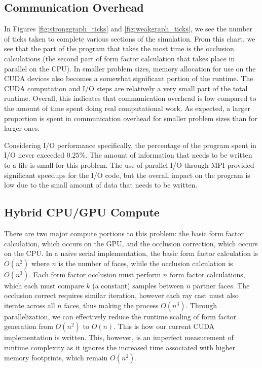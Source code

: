 \documentclass[conference]{IEEEtran}
\begin{document}
\subsection{Communication Overhead}
In Figures \ref{fig:stronggraph_ticks} and \ref{fig:weakgraph_ticks}, we see the number of ticks taken to complete various sections of the simulation. From this chart, we see that the part of the program that takes the most time is the occlusion calculations (the second part of form factor calculation that takes place in parallel on the CPU). In smaller problem sizes, memory allocation for use on the CUDA devices also becomes a somewhat significant portion of the runtime. The CUDA computation and I/O steps are relatively a very small part of the total runtime. Overall, this indicates that communication overhead is low compared to the amount of time spent doing real computational work. As expected, a larger proportion is spent in communication overhead for smaller problem sizes than for larger ones.

Considering I/O performance specifically, the percentage of the program spent in I/O never exceeded $0.25\%$. The amount of information that needs to be written to a file is small for this problem. The use of parallel I/O through MPI provided significant speedups for the I/O code, but the overall impact on the program is low due to the small amount of data that needs to be written.

\subsection{Hybrid CPU/GPU Compute}
There are two major compute portions to this problem: the basic form factor calculation, which occurs on the GPU, and the occlusion correction, which occurs on the CPU. In a naive serial implementation, the basic form factor calculation is $O(n^2)$ where $n$ is the number of faces, while the occlusion calculation is $O(n^3)$. Each form factor occlusion must perform $n$ form factor calculations, which each must compare $k$ (a constant) samples between $n$ partner faces. The occlusion correct requires similar iteration, however each ray cast must also iterate across all $n$ faces, thus making the process $O(n^3)$. Through parallelization, we can effectively reduce the runtime scaling of form factor generation from $O(n^2)$ to $O(n)$. This is how our current CUDA implementation is written. This, however, is an imperfect measurement of runtime complexity as it ignores the increased time associated with higher memory footprints, which remain $O(n^2)$. 
\end{document}
